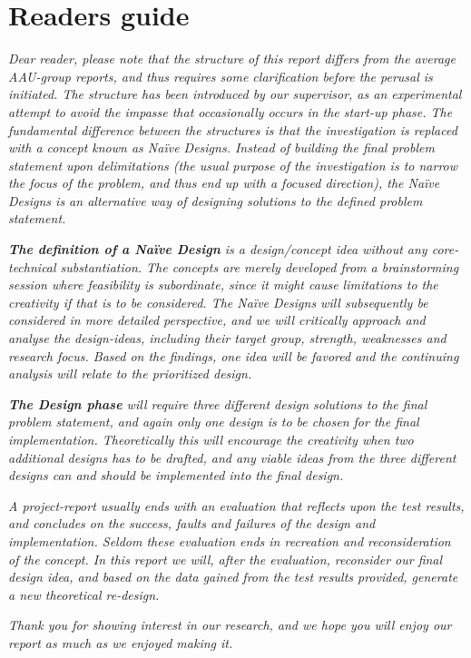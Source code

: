 \section{Readers guide}
\textit{Dear reader, please note that the structure of this report differs from the average AAU-group reports, and thus requires some clarification before the perusal is initiated. 
The structure has been introduced by our supervisor, as an experimental attempt to avoid the impasse that occasionally occurs in the start-up phase.
The fundamental difference between the structures is that the investigation is replaced with a concept known as Naïve Designs. Instead of building the final problem statement upon delimitations (the usual purpose of the investigation is to narrow the focus of the problem, and thus end up with a focused direction), the Naïve Designs is an alternative way of designing solutions to the defined problem statement.}
\bigskip

\textit{\textbf{The definition of a Naïve Design} is a design/concept idea without any core-technical substantiation. 
The concepts are merely developed from a brainstorming session where feasibility is subordinate, since it might cause limitations to the creativity if that is to be considered.	
The Naïve Designs will subsequently be considered in more detailed perspective, and we will critically approach and analyse the design-ideas, including their target group, strength, weaknesses and research focus. 
Based on the findings, one idea will be favored and the continuing analysis will relate to the prioritized design.}
\bigskip

\textit{\textbf{The Design phase} will require three different design solutions to the final problem statement, and again only one design is to be chosen for the final implementation. 
Theoretically this will encourage the creativity when two additional designs has to be drafted, and any viable ideas from the three different designs can and should be implemented into the final design.}
\bigskip

\textit{A project-report usually ends with an evaluation that reflects upon the test results, and concludes on the success, faults and failures of the design and implementation. 
Seldom these evaluation ends in recreation and reconsideration of the concept. 
In this report we will, after the evaluation, reconsider our final design idea, and based on the data gained from the test results provided, generate a new theoretical re-design.}
\bigskip

\textit{Thank you for showing interest in our research, and we hope you will enjoy our report as much as we enjoyed making it.}
\bigskip

